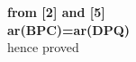 \documentclass[journal,12pt,twocolumn]{IEEEtran}
\let\vec\mathbf
\begin{document}
\begin{tableofcontents}
\begin{flushleft}
\textbf{from [2] and [5]}\\
\vspace{0.1cm}
\textbf{ar(BPC)=ar(DPQ)}\\
\vspace{0.1cm}
hence proved\\


\end{flushleft}
\end{tableofcontents}
\end{document}
